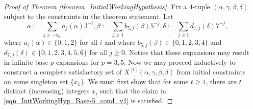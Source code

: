 \documentclass[12pt]{article}
\begin{document}
\begin{proof}[Proof of Theorem \ref{theorem_InitialWorkingHypothesis}]
Fix a $4$-tuple $(\alpha,\gamma,\beta,\delta)$ subject to the constraints in the theorem statement. 
Let 
\[
\alpha := \sum_{j \geq -u_{\alpha}} a_j(\alpha) 3^{-i}, 
\beta := \sum_{j \geq 1} b_{5,j}(\beta) 5^{-j}, 
\delta := \sum_{j \geq 1} d_{7,j}(\delta) 7^{-j}, 
\] 
where $a_i(\alpha) \in \{0,1,2\}$ for all $i$ and where 
$b_{5,j}(\beta) \in \{0,1,2,3,4\}$ and $d_{7,j}(\delta) \in \{0,1,2,3,4,5,6\}$ for all $j \geq 0$. 
Notice that these expansions may result in infinite 
base-$p$ expansions for $p=3,5$. Now we may proceed inductively to construct a complete satisfactory set 
of $X^{[t]}(\alpha,\gamma,\beta,\delta)$ from initial constraints on some singleton set $\{x_1\}$. 
We must first show that for some $t \geq 1$, there are $t$ distinct (increasing) integers $x_i$ such that the 
claim in \eqref{eqn_InitWorkingHyp_Base-5_cond_v1} is satisfied. 


\end{proof}
\end{document}
